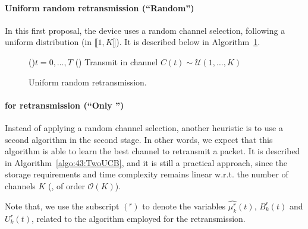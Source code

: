 \paragraph{Uniform random retransmission (``Random'')}\label{sub:43:UCBthenRandom}

In this first proposal, the device uses a random channel selection, following a uniform distribution (in $\llbracket 1, K \rrbracket$).
It is described below in Algorithm~\ref{algo:43:UCBthenRandom}.

\vspace*{-3pt}
\begin{figure}[h!]
	\centering
	\begin{algorithm}[H]
	\For(){$t = 0, \dots, T$}{
			\Else(){
				Transmit in channel $C(t) \sim \mathcal{U}(1,\ldots,K)$\;
			}
		}
		\caption{Uniform random retransmission.}    %
		\label{algo:43:UCBthenRandom}
\end{algorithm}
\end{figure}


\paragraph{\UCB{} for retransmission (``Only \UCB{}'')}\label{sub:43:TwoUCB}

Instead of applying a random channel selection,
another heuristic is to use a second \UCB{} algorithm in the second stage.
In other words, we expect that this algorithm is able to learn the best channel to retransmit a packet.
It is described in Algorithm~\ref{algo:43:TwoUCB}, and it is still a practical approach, since the storage requirements and time complexity remains linear w.r.t. the number of channels $K$ (\ie, of order $\mathcal{O}(K)$).

Note that, we use the subscript $({}^r)$ to denote the variables
$\widehat{\mu^r_k}(t)$, $B^r_k(t)$ and $U^r_k(t)$,
related to the \UCB{} algorithm employed for the retransmission.

